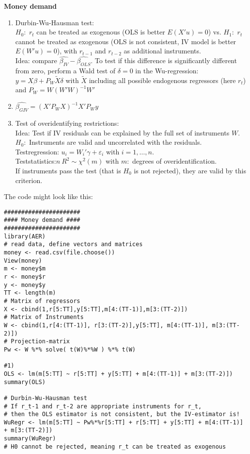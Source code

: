 \documentclass{article}
\begin{document}
\begin{solution}
\textbf{Money demand}
\begin{enumerate}
  \item Durbin-Wu-Hausman test: \\
  $H_0:$ $r_t$ can be treated as exogenous (OLS is better $E(X'u)=0$) vs.
      $H_1:$ $r_t$ cannot be treated as exogenous (OLS is not consistent,
      IV model is better $E(W'u)=0$), with $r_{t-1}$ and $r_{t-2}$ as
      additional instruments.\\
      Idea: compare $\widehat{\beta_{IV}} -
      \widehat{\beta_{OLS}}$. To test if this difference is significantly
      different from zero, perform a Wald test of $\delta=0$ in the
      Wu-regression: $y=X\beta + P_W \widetilde{X}\delta$ with
      $\widetilde{X}$ including all possible endogenous regressors (here
      $r_t$) and $P_W = W(W'W)^{-1}W'$
  \item $\widehat{\beta_{GIV}} = (X'P_WX)^{-1}X'P_Wy$
  \item Test of overidentifying restrictions: \\
  Idea: Test if IV residuals can be explained by the full set of
      instruments $W$.\\ $H_0:$ Instruments are valid and uncorrelated
      with the residuals. \\Testregression: $u_i=W_i'\gamma +
      \varepsilon_i$ with $i=1,\dots,n$. \\Teststatistics:$n~R^2 \sim
      \chi^2(m)$ with $m:$ degrees of overidentification. \\If
      instruments pass the test (that is $H_0$ is not rejected), they are
      valid by this criterion.
\end{enumerate}
The code might look like this:
\begin{verbatim}
######################
#### Money demand ####
######################
library(AER)
# read data, define vectors and matrices
money <- read.csv(file.choose())
View(money)
m <- money$m
r <- money$r
y <- money$y
TT <- length(m)
# Matrix of regressors
X <- cbind(1,r[5:TT],y[5:TT],m[4:(TT-1)],m[3:(TT-2)])
# Matrix of Instruments
W <- cbind(1,r[4:(TT-1)], r[3:(TT-2)],y[5:TT], m[4:(TT-1)], m[3:(TT-2)])
# Projection-matrix
Pw <- W %*% solve( t(W)%*%W ) %*% t(W)

#1)
OLS <- lm(m[5:TT] ~ r[5:TT] + y[5:TT] + m[4:(TT-1)] + m[3:(TT-2)])
summary(OLS)

# Durbin-Wu-Hausman test
# If r_t-1 and r_t-2 are appropriate instruments for r_t,
# then the OLS estimator is not consistent, but the IV-estimator is!
WuRegr <- lm(m[5:TT] ~ Pw%*%r[5:TT] + r[5:TT] + y[5:TT] + m[4:(TT-1)] + m[3:(TT-2)])
summary(WuRegr)
# H0 cannot be rejected, meaning r_t can be treated as exogenous


\end{verbatim}
\end{solution}
\end{document}
